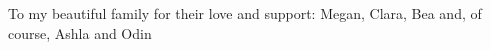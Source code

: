 
\thispagestyle{empty}

\begin{center}
To my beautiful family for their love and support:
Megan, Clara, Bea and, of course, Ashla and Odin


\end{center}

\setlength{\abovedisplayskip}{-5pt}
\setlength{\abovedisplayshortskip}{-5pt}
